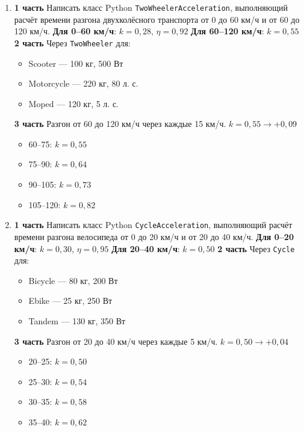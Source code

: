 \begin{enumerate}
    \item[5] \textbf{1 часть}  
    Написать класс Python \texttt{TwoWheelerAcceleration}, выполняющий расчёт времени разгона двухколёсного транспорта от 0 до 60 км/ч и от 60 до 120 км/ч.  
    \textbf{Для 0–60 км/ч}: $k = 0{,}28$, $\eta = 0{,}92$  
    \textbf{Для 60–120 км/ч}: $k = 0{,}55$  
    \textbf{2 часть}  
    Через \texttt{TwoWheeler} для:  
    \begin{itemize}
        \item Scooter — 100 кг, 500 Вт  
        \item Motorcycle — 220 кг, 80 л. с.  
        \item Moped — 120 кг, 5 л. с.  
    \end{itemize}
    \textbf{3 часть}  
    Разгон от 60 до 120 км/ч через каждые 15 км/ч. $k = 0{,}55 \to +0{,}09$  
    \begin{itemize}
        \item 60–75: $k = 0{,}55$  
        \item 75–90: $k = 0{,}64$  
        \item 90–105: $k = 0{,}73$  
        \item 105–120: $k = 0{,}82$  
    \end{itemize}

    \item[6] \textbf{1 часть}  
    Написать класс Python \texttt{CycleAcceleration}, выполняющий расчёт времени разгона велосипеда от 0 до 20 км/ч и от 20 до 40 км/ч.  
    \textbf{Для 0–20 км/ч}: $k = 0{,}30$, $\eta = 0{,}95$  
    \textbf{Для 20–40 км/ч}: $k = 0{,}50$  
    \textbf{2 часть}  
    Через \texttt{Cycle} для:  
    \begin{itemize}
        \item Bicycle — 80 кг, 200 Вт  
        \item Ebike — 25 кг, 250 Вт  
        \item Tandem — 130 кг, 350 Вт  
    \end{itemize}
    \textbf{3 часть}  
    Разгон от 20 до 40 км/ч через каждые 5 км/ч. $k = 0{,}50 \to +0{,}04$  
    \begin{itemize}
        \item 20–25: $k = 0{,}50$  
        \item 25–30: $k = 0{,}54$  
        \item 30–35: $k = 0{,}58$  
        \item 35–40: $k = 0{,}62$  
    \end{itemize}


\end{enumerate}
